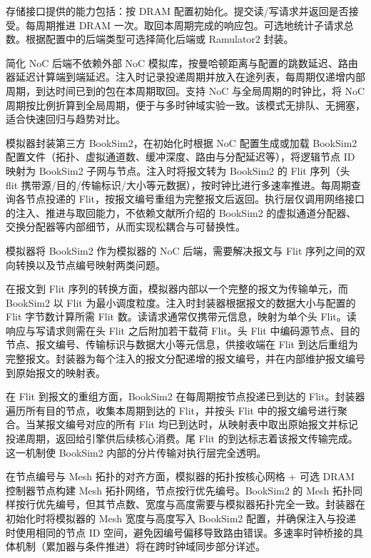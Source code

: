 存储接口提供的能力包括：按 DRAM 配置初始化。提交读/写请求并返回是否接受。每周期推进 DRAM 一次。取回本周期完成的响应包。可选地统计子请求总数。根据配置中的后端类型可选择简化后端或 Ramulator2 封装。


简化 NoC 后端不依赖外部 NoC 模拟库，按曼哈顿距离与配置的跳数延迟、路由器延迟计算端到端延迟。注入时记录投递周期并放入在途列表，每周期仅递增内部周期，到达时间已到的包在本周期取回。支持 NoC 与全局周期的时钟比，将 NoC 周期按比例折算到全局周期，便于与多时钟域实验一致。该模式无排队、无拥塞，适合快速回归与趋势对比。

模拟器封装第三方 BookSim2，在初始化时根据 NoC 配置生成或加载 BookSim2 配置文件（拓扑、虚拟通道数、缓冲深度、路由与分配延迟等），将逻辑节点 ID 映射为 BookSim2 子网与节点。注入时将报文转为 BookSim2 的 Flit 序列（头 flit 携带源/目的/传输标识/大小等元数据），按时钟比进行多速率推进。每周期查询各节点投递的 Flit，按报文编号重组为完整报文后返回。执行层仅调用网络接口的注入、推进与取回能力，不依赖文献\parencite{jiang2013booksim}所介绍的 BookSim2 的虚拟通道分配器、交换分配器等内部细节，从而实现松耦合与可替换性。

模拟器将 BookSim2 作为模拟器的 NoC 后端，需要解决报文与 Flit 序列之间的双向转换以及节点编号映射两类问题。

在报文到 Flit 序列的转换方面，模拟器内部以一个完整的报文为传输单元，而 BookSim2 以 Flit 为最小调度粒度。注入时封装器根据报文的数据大小与配置的 Flit 字节数计算所需 Flit 数。读请求通常仅携带元信息，映射为单个头 Flit。读响应与写请求则需在头 Flit 之后附加若干载荷 Flit。头 Flit 中编码源节点、目的节点、报文编号、传输标识与数据大小等元信息，供接收端在 Flit 到达后重组为完整报文。封装器为每个注入的报文分配递增的报文编号，并在内部维护报文编号到原始报文的映射表。

在 Flit 到报文的重组方面，BookSim2 在每周期按节点投递已到达的 Flit。封装器遍历所有目的节点，收集本周期到达的 Flit，并按头 Flit 中的报文编号进行聚合。当某报文编号对应的所有 Flit 均已到达时，从映射表中取出原始报文并标记投递周期，返回给引擎供后续核心消费。尾 Flit 的到达标志着该报文传输完成。这一机制使 BookSim2 内部的分片传输对执行层完全透明。

在节点编号与 Mesh 拓扑的对齐方面，模拟器的拓扑按核心网格 + 可选 DRAM 控制器节点构建 Mesh 拓扑网络，节点按行优先编号。BookSim2 的 Mesh 拓扑同样按行优先编号，但其节点数、宽度与高度需要与模拟器拓扑完全一致。封装器在初始化时将模拟器的 Mesh 宽度与高度写入 BookSim2 配置，并确保注入与投递时使用相同的节点 ID 空间，避免因编号偏移导致路由错误。多速率时钟桥接的具体机制（累加器与条件推进）将在跨时钟域同步部分详述。

